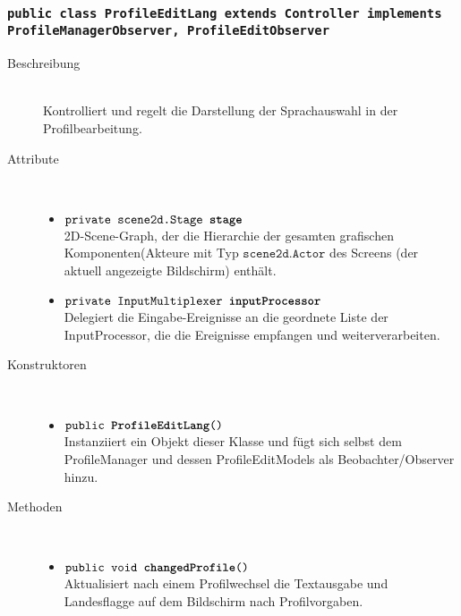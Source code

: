 \subsubsection{\normalfont \texttt{public class \textbf{ProfileEditLang} extends Controller implements ProfileManagerObserver, ProfileEditObserver}}

\begin{description}
\item[Beschreibung] \hfill \\ Kontrolliert und regelt die Darstellung der Sprachauswahl in der Profilbearbeitung.
\item[Attribute] \hfill \\
	\vspace{-.8cm}
	\begin{itemize}
		\item $\texttt{private scene2d.Stage \textbf{stage}}$ \\ 2D-Scene-Graph, der die Hierarchie der gesamten grafischen Komponenten(Akteure mit Typ $\texttt{scene2d.Actor}$ des Screens (der aktuell angezeigte Bildschirm) enthält. 
		\item $\texttt{private InputMultiplexer \textbf{inputProcessor}}$ \\ Delegiert die Eingabe-Ereignisse an die geordnete Liste der InputProcessor, die die Ereignisse empfangen und weiterverarbeiten.
	\end{itemize}
	
\item[Konstruktoren] \hfill \\
	\vspace{-.8cm}
	\begin{itemize}
		\item $\texttt{public \textbf{ProfileEditLang}()}$ \\ Instanziiert ein Objekt dieser Klasse und fügt sich selbst dem ProfileManager und dessen ProfileEditModels als Beobachter/Observer hinzu.
	\end{itemize}
	
\item[Methoden] \hfill \\
	\vspace{-.8cm}
	\begin{itemize}		
		\item $\texttt{public void \textbf{changedProfile}()}$ \\ Aktualisiert nach einem Profilwechsel die Textausgabe und Landesflagge auf dem Bildschirm nach Profilvorgaben.
		

\end{itemize}
\end{description}
